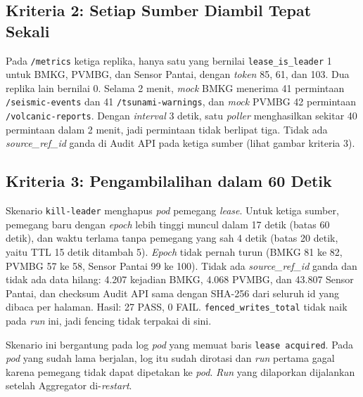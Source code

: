 
\subsection{Kriteria 2: Setiap Sumber Diambil Tepat Sekali}

Pada \texttt{/metrics} ketiga replika, hanya satu yang bernilai \texttt{lease\_is\_leader} 1 untuk BMKG, PVMBG, dan Sensor Pantai, dengan \textit{token} 85, 61, dan 103. Dua replika lain bernilai 0. Selama 2 menit, \textit{mock} BMKG menerima 41 permintaan \texttt{/seismic-events} dan 41 \texttt{/tsunami-warnings}, dan \textit{mock} PVMBG 42 permintaan \texttt{/volcanic-reports}. Dengan \textit{interval} 3 detik, satu \textit{poller} menghasilkan sekitar 40 permintaan dalam 2 menit, jadi permintaan tidak berlipat tiga. Tidak ada \textit{source\_ref\_id} ganda di Audit API pada ketiga sumber (lihat gambar kriteria 3).


\subsection{Kriteria 3: Pengambilalihan dalam 60 Detik}

Skenario \texttt{kill-leader} menghapus \textit{pod} pemegang \textit{lease}. Untuk ketiga sumber, pemegang baru dengan \textit{epoch} lebih tinggi muncul dalam 17 detik (batas 60 detik), dan waktu terlama tanpa pemegang yang sah 4 detik (batas 20 detik, yaitu TTL 15 detik ditambah 5). \textit{Epoch} tidak pernah turun (BMKG 81 ke 82, PVMBG 57 ke 58, Sensor Pantai 99 ke 100). Tidak ada \textit{source\_ref\_id} ganda dan tidak ada data hilang: 4.207 kejadian BMKG, 4.068 PVMBG, dan 43.807 Sensor Pantai, dan checksum Audit API sama dengan SHA-256 dari seluruh id yang dibaca per halaman. Hasil: 27 PASS, 0 FAIL. \texttt{fenced\_writes\_total} tidak naik pada \textit{run} ini, jadi fencing tidak terpakai di sini.

Skenario ini bergantung pada log \textit{pod} yang memuat baris \texttt{lease acquired}. Pada \textit{pod} yang sudah lama berjalan, log itu sudah dirotasi dan \textit{run} pertama gagal karena pemegang tidak dapat dipetakan ke \textit{pod}. \textit{Run} yang dilaporkan dijalankan setelah Aggregator di-\textit{restart}.

